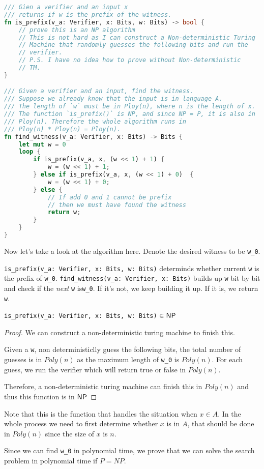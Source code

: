 \begin{lstlisting}[language=Rust]
/// Gien a verifier and an input x
/// returns if w is the prefix of the witness.
fn is_prefix(v_a: Verifier, x: Bits, w: Bits) -> bool {
    // prove this is an NP algorithm
    // This is not hard as I can construct a Non-deterministic Turing
    // Machine that randomly guesses the following bits and run the 
    // verifier.
    // P.S. I have no idea how to prove without Non-deterministic 
    // TM.
}

/// Given a verifier and an input, find the witness.
/// Suppose we already know that the input is in language A.
/// The length of `w` must be in Ploy(n), where n is the length of x.
/// The function `is_prefix()` is NP, and since NP = P, it is also in
/// Ploy(n). Therefore the whole algorithm runs in 
/// Ploy(n) * Ploy(n) = Ploy(n).
fn find_witness(v_a: Verifier, x: Bits) -> Bits {
    let mut w = 0
    loop {
        if is_prefix(v_a, x, (w << 1) + 1) {
            w = (w << 1) + 1;
        } else if is_prefix(v_a, x, (w << 1) + 0)  {
            w = (w << 1) + 0;
        } else {
            // If add 0 and 1 cannot be prefix
            // then we must have found the witness
            return w;
        }
    }
}
\end{lstlisting}

Now let's take a look at the algorithm here. Denote the desired witness to be 
\lstinline{w_0}. 

\lstinline{is_prefix(v_a: Verifier, x: Bits, w: Bits)} determinds whether current \lstinline{w} is the 
prefix of \lstinline{w_0}. \lstinline{find_witness(v_a: Verifier, x: Bits)} builds up \lstinline{w} bit by 
bit and check if the \emph{next} \lstinline{w} is\lstinline{w_0}. If it's not, we keep building it 
up. If it is, we return \lstinline{w}.

\begin{theorem}
    \lstinline{is_prefix(v_a: Verifier, x: Bits, w: Bits)} $\in \mathsf{NP}$
\end{theorem}

\begin{proof}
	We can construct a non-deterministic turing machine to finish this.
	
	Given a \lstinline{w}, non deterministiclly guess the following bits, the total number of guesses is in $Poly(n)$ as the maximum length of \lstinline{w_0} is $Poly(n)$. 
	For each guess, we run the verifier which will return true or false in $Poly(n)$.

	Therefore, a non-deterministic turing machine can finish this in $Poly(n)$ and thus this function is in $\mathsf{NP}$
\end{proof}

Note that this is the function that handles the situation when $x \in A$. 
In the whole process we need to first determine whether $x$ is in $A$, that should be done in $Poly(n)$ since the size of $x$ is $n$. 

Since we can find \lstinline{w_0} in polynomial time, we prove that we can solve the search problem in polynomial time if $P = NP$.

